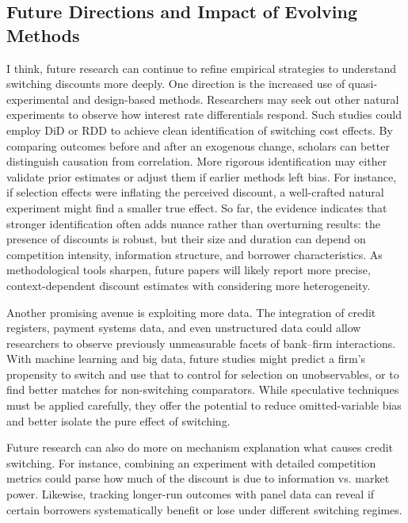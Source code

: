 \subsection{Future Directions and Impact of Evolving Methods}

I think, future research can continue to refine empirical strategies to understand switching discounts more deeply. One direction is the increased use of quasi-experimental and design-based methods. Researchers may seek out other natural experiments to observe how interest rate differentials respond. Such studies could employ DiD or RDD to achieve clean identification of switching cost effects. By comparing outcomes before and after an exogenous change, scholars can better distinguish causation from correlation. More rigorous identification may either validate prior estimates or adjust them if earlier methods left bias. For instance, if selection effects were inflating the perceived discount, a well-crafted natural experiment might find a smaller true effect. So far, the evidence indicates that stronger identification often adds nuance rather than overturning results: the presence of discounts is robust, but their size and duration can depend on competition intensity, information structure, and borrower characteristics. As methodological tools sharpen, future papers will likely report more precise, context-dependent discount estimates with considering more heterogeneity.

Another promising avenue is exploiting more data. The integration of credit registers, payment systems data, and even unstructured data could allow researchers to observe previously unmeasurable facets of bank--firm interactions. With machine learning and big data, future studies might predict a firm's propensity to switch and use that to control for selection on unobservables, or to find better matches for non-switching comparators. While speculative techniques must be applied carefully, they offer the potential to reduce omitted-variable bias and better isolate the pure effect of switching. 

Future research can also do more on mechanism explanation what causes credit switching. For instance, combining an experiment with detailed competition metrics could parse how much of the discount is due to information vs. market power. Likewise, tracking longer-run outcomes with panel data can reveal if certain borrowers systematically benefit or lose under different switching regimes. 
